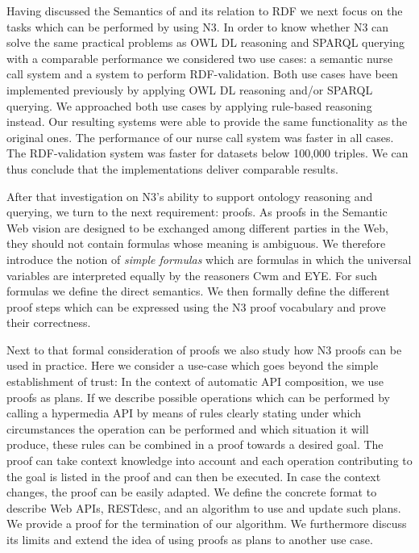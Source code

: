 Having discussed the Semantics of \nthree and its relation to RDF we next focus on the tasks which can be performed by using N3. In order to know 
whether N3 can solve the same practical problems as OWL DL reasoning and SPARQL querying with a comparable performance we considered two use cases: a semantic nurse call 
system and a system to perform RDF-validation. Both use cases have been implemented previously by applying OWL DL reasoning and/or SPARQL querying.
We approached both use cases by applying rule-based reasoning instead. Our resulting systems were able to provide the same functionality as the original ones.
The performance of our nurse call system was faster in all cases.  
The RDF-validation system was faster for datasets below 100,000 triples. We can thus conclude that the implementations deliver comparable results.

After that investigation on N3's ability to support ontology reasoning and querying, we turn to the next requirement: proofs. 
As proofs in the Semantic Web vision are designed to be exchanged among different parties in the Web, they should not contain formulas whose meaning is ambiguous.
We therefore introduce the notion of \emph{simple formulas} which are formulas in which the universal variables are interpreted equally by the reasoners Cwm and EYE. 
For such formulas we define the direct semantics. We then formally define the different proof steps which can be expressed 
using the N3 proof vocabulary and prove their correctness.

Next to that formal consideration of proofs we also study how N3 proofs can be used in practice. Here we consider a use-case which goes beyond the simple establishment of trust:
In the context of automatic API composition, we use proofs as plans. If we describe possible operations
which can be performed by calling a hypermedia API by means of rules clearly stating under which circumstances 
 the operation can be performed and which situation it will produce, these rules can be combined in a proof towards a desired goal.
The proof can take context knowledge into account and each operation contributing to the goal is listed in the proof and can then be executed. In case the context changes,
the proof can be easily adapted. We define the concrete format to describe Web APIs, RESTdesc, and an algorithm to use and update such plans. We provide a proof for 
the termination of our algorithm. We furthermore discuss its limits and extend the idea of using proofs as plans to another use case.


